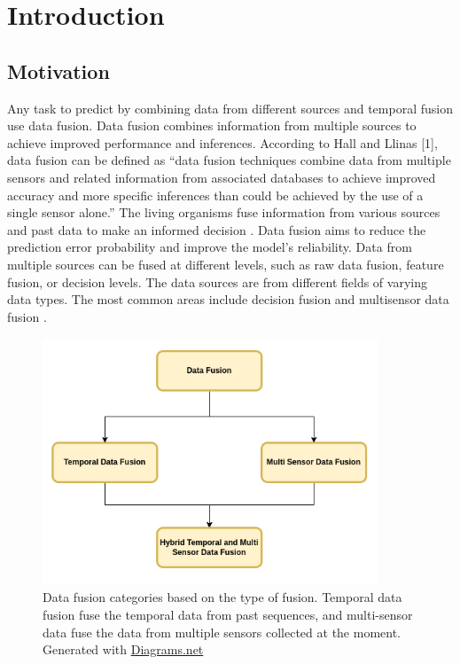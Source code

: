 
    \chapter{Introduction}
	\label{chap:introduction}
	
	\section{Motivation}
		
	Any task to predict by combining data from different sources and temporal fusion use data fusion. Data fusion combines information from multiple sources to achieve improved performance and inferences. According to Hall and Llinas [1], data fusion can be defined as “data fusion techniques combine data from multiple sensors and related information from associated databases to achieve improved accuracy and more specific inferences than could be achieved by the use of a single sensor alone.” The living organisms fuse information from various sources and past data to make an informed decision \cite{01_mandic2005data}.  
	Data fusion aims to reduce the prediction error probability and improve the model's reliability. Data from multiple sources can be fused at different levels, such as raw data fusion, feature fusion, or decision levels. The data sources are from different fields of varying data types. The most common areas include decision fusion and multisensor data fusion \cite{06_castanedo2013review}. 
	
	\begin{figure}[h]
		\centering
		\includegraphics[width=10cm]{images/df.png}
		\caption{Data fusion categories based on the type of fusion. Temporal data fusion fuse the temporal data from past sequences, and multi-sensor data fuse the data from multiple sensors collected at the moment. Generated with \href{https://app.diagrams.net/}{Diagrams.net} }
		\label{fig:3D_reconstruction}
	\end{figure}

